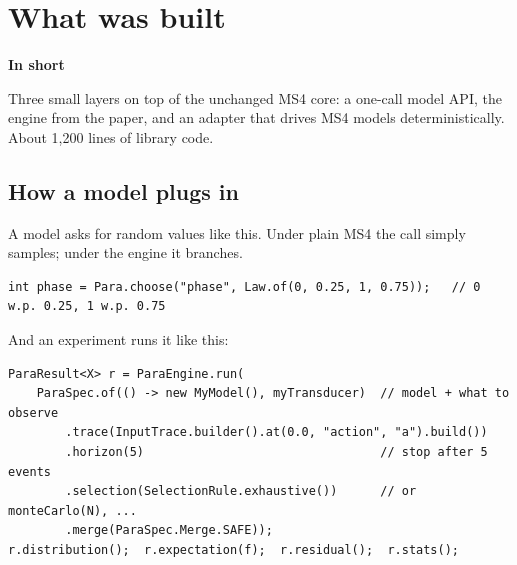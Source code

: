 \documentclass[11pt]{article}
\newcommand{\code}[1]{\texttt{#1}}
\newcommand{\shadedbox}[3]{\par\smallskip\noindent\colorbox{#1}{\parbox{\dimexpr\linewidth-2\fboxsep}{\textbf{#2}\par #3}}\par\smallskip}
\newcommand{\takeaway}[1]{\shadedbox{okbg}{In short}{#1}}
\begin{document}
\section{What was built}\label{sec:built}

\takeaway{Three small layers on top of the unchanged MS4 core: a one-call model API, the engine from the paper, and an
adapter that drives MS4 models deterministically. About 1{,}200 lines of library code.}

\begin{center}
\end{center}

\subsection{How a model plugs in}
A model asks for random values like this. Under plain MS4 the call simply samples; under the engine it branches.
\begin{lstlisting}
int phase = Para.choose("phase", Law.of(0, 0.25, 1, 0.75));   // 0 w.p. 0.25, 1 w.p. 0.75
\end{lstlisting}
And an experiment runs it like this:
\begin{lstlisting}
ParaResult<X> r = ParaEngine.run(
    ParaSpec.of(() -> new MyModel(), myTransducer)  // model + what to observe
        .trace(InputTrace.builder().at(0.0, "action", "a").build())
        .horizon(5)                                 // stop after 5 events
        .selection(SelectionRule.exhaustive())      // or monteCarlo(N), ...
        .merge(ParaSpec.Merge.SAFE));
r.distribution();  r.expectation(f);  r.residual();  r.stats();
\end{lstlisting}
\end{document}
